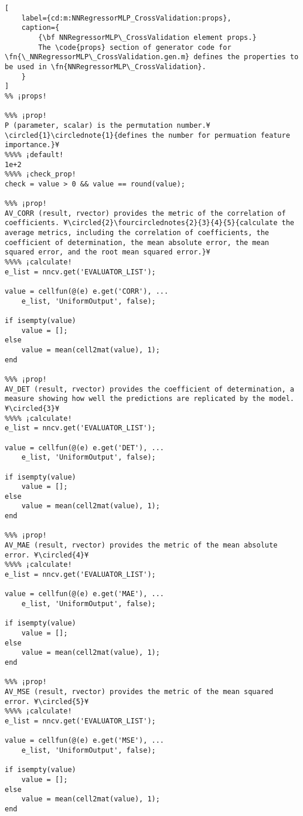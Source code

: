 \documentclass{tufte-handout}
\begin{document}
\begin{lstlisting}[
	label={cd:m:NNRegressorMLP_CrossValidation:props},
	caption={
		{\bf NNRegressorMLP\_CrossValidation element props.}
		The \code{props} section of generator code for \fn{\_NNRegressorMLP\_CrossValidation.gen.m} defines the properties to be used in \fn{NNRegressorMLP\_CrossValidation}.
	}
]
%% ¡props!

%%% ¡prop!
P (parameter, scalar) is the permutation number.¥\circled{1}\circlednote{1}{defines the number for permuation feature importance.}¥
%%%% ¡default!
1e+2
%%%% ¡check_prop!
check = value > 0 && value == round(value);

%%% ¡prop!
AV_CORR (result, rvector) provides the metric of the correlation of coefficients. ¥\circled{2}\fourcirclednotes{2}{3}{4}{5}{calculate the average metrics, including the correlation of coefficients, the coefficient of determination, the mean absolute error, the mean squared error, and the root mean squared error.}¥
%%%% ¡calculate!
e_list = nncv.get('EVALUATOR_LIST');

value = cellfun(@(e) e.get('CORR'), ...
    e_list, 'UniformOutput', false);

if isempty(value)
    value = [];
else
    value = mean(cell2mat(value), 1);
end

%%% ¡prop!
AV_DET (result, rvector) provides the coefficient of determination, a measure showing how well the predictions are replicated by the model. ¥\circled{3}¥
%%%% ¡calculate!
e_list = nncv.get('EVALUATOR_LIST');

value = cellfun(@(e) e.get('DET'), ...
    e_list, 'UniformOutput', false);

if isempty(value)
    value = [];
else
    value = mean(cell2mat(value), 1);
end

%%% ¡prop!
AV_MAE (result, rvector) provides the metric of the mean absolute error. ¥\circled{4}¥
%%%% ¡calculate!
e_list = nncv.get('EVALUATOR_LIST');

value = cellfun(@(e) e.get('MAE'), ...
    e_list, 'UniformOutput', false);

if isempty(value)
    value = [];
else
    value = mean(cell2mat(value), 1);
end

%%% ¡prop!
AV_MSE (result, rvector) provides the metric of the mean squared error. ¥\circled{5}¥
%%%% ¡calculate!
e_list = nncv.get('EVALUATOR_LIST');

value = cellfun(@(e) e.get('MSE'), ...
    e_list, 'UniformOutput', false);

if isempty(value)
    value = [];
else
    value = mean(cell2mat(value), 1);
end


\end{lstlisting}
\end{document}
